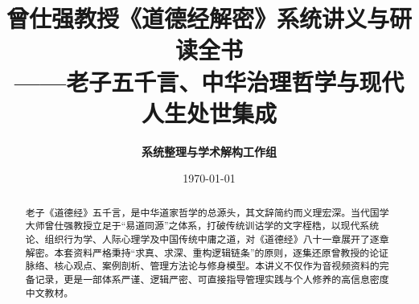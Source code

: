 \documentclass[UTF8,a4paper,12pt]{ctexart}
\title{\Huge\textbf{曾仕强教授《道德经解密》系统讲义与研读全书}\\[0.5em]
\large——老子五千言、中华治理哲学与现代人生处世集成}
\author{\textbf{系统整理与学术解构工作组}}
\date{\today}
\begin{document}
\maketitle
\thispagestyle{empty}

\begin{abstract}
老子《道德经》五千言，是中华道家哲学的总源头，其文辞简约而义理宏深。当代国学大师曾仕强教授立足于“易道同源”之体系，打破传统训诂学的文字桎梏，以现代系统论、组织行为学、人际心理学及中国传统中庸之道，对《道德经》八十一章展开了逐章解密。本套资料严格秉持“求真、求深、重构逻辑链条”的原则，逐集还原曾教授的论证脉络、核心观点、案例剖析、管理方法论与修身模型。本讲义不仅作为音视频资料的完备记录，更是一部体系严谨、逻辑严密、可直接指导管理实践与个人修养的高信息密度中文教材。
\end{abstract}

\clearpage
\tableofcontents
\clearpage
















\end{document}
